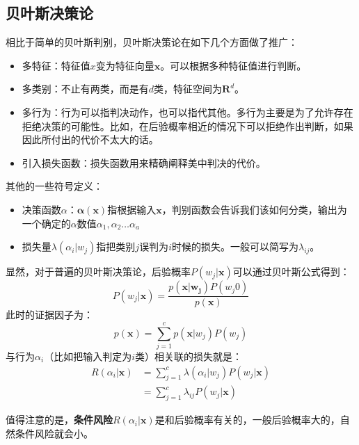 \documentclass[12pt, letterpaper]{article}
\begin{document}
\subsection{贝叶斯决策论}
相比于简单的贝叶斯判别，贝叶斯决策论在如下几个方面做了推广：
\begin{itemize}
\item 多特征：特征值$x$变为特征向量$\mathbf{x}$。可以根据多种特征值进行判断。
\item 多类别：不止有两类，而是有$d$类，特征空间为$\mathbf{R}^d$。
\item 多行为：行为可以指判决动作，也可以指代其他。多行为主要是为了允许存在拒绝决策的可能性。比如，在后验概率相近的情况下可以拒绝作出判断，如果因此所付出的代价不太大的话。
\item 引入损失函数：损失函数用来精确阐释美中判决的代价。
\end{itemize}
其他的一些符号定义：
\begin{itemize}
\item 决策函数$\alpha$：$\mathbf{\alpha}(\mathbf{x})$指根据输入$\mathbf{x}$，判别函数会告诉我们该如何分类，输出为一个确定的$\alpha$数值$\alpha_1,\alpha_2\ldots \alpha_a$
\item 损失量$\lambda(\alpha_i|w_j)$指把类别$j$误判为$i$时候的损失。一般可以简写为$\lambda_{ij}$。
\end{itemize}

显然，对于普遍的贝叶斯决策论，后验概率$P(w_j|\mathbf{x})$可以通过贝叶斯公式得到：
\begin{equation}
P(w_j|\mathbf{x})=\frac{p(\mathbf{x|w_j})P(w_j0)}{p(\mathbf{x})}
\end{equation}
此时的证据因子为：
\begin{equation}
p(\mathbf{x})=\sum_{j=1}^{c}p(\mathbf{x}|w_j)P(w_j)
\end{equation}
与行为$\alpha_i$（比如把输入判定为$i$类）相关联的损失就是：
\begin{equation}
\begin{aligned}
R(\alpha_i|\mathbf{x})&=\sum_{j=1}^{c}\lambda(\alpha_i|w_j)P(w_j|\mathbf{x})\\
&=\sum_{j=1}^{c}\lambda_{ij}P(w_j|\mathbf{x})
\end{aligned}
\end{equation}

值得注意的是，\textbf{条件风险}$R(\alpha_i|\mathbf{x})$是和后验概率有关的，一般后验概率大的，自然条件风险就会小。
\end{document}
